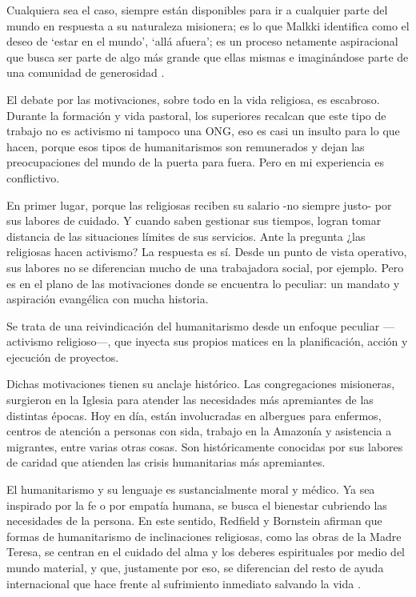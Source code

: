 \documentclass[
  spanish,
  11pt,
  a4paper,
]{scrbook}
\begin{document}
Cualquiera sea el caso, siempre están disponibles para ir a cualquier
parte del mundo en respuesta a su naturaleza misionera; es lo que Malkki
identifica como el deseo de `estar en el mundo', `allá afuera'; es un
proceso netamente aspiracional que busca ser parte de algo más grande
que ellas mismas e imaginándose parte de una comunidad de generosidad
\autocite[14]{Malkki2015}.

El debate por las motivaciones, sobre todo en la vida religiosa, es
escabroso. Durante la formación y vida pastoral, los superiores recalcan
que este tipo de trabajo no es activismo ni tampoco una ONG, eso es casi
un insulto para lo que hacen, porque esos tipos de humanitarismos son
remunerados y dejan las preocupaciones del mundo de la puerta para
fuera. Pero en mi experiencia es conflictivo.

En primer lugar, porque las religiosas reciben su salario -no siempre
justo- por sus labores de cuidado. Y cuando saben gestionar sus tiempos,
logran tomar distancia de las situaciones límites de sus servicios. Ante
la pregunta ¿las religiosas hacen activismo? La respuesta es sí. Desde
un punto de vista operativo, sus labores no se diferencian mucho de una
trabajadora social, por ejemplo. Pero es en el plano de las motivaciones
donde se encuentra lo peculiar: un mandato y aspiración evangélica con
mucha historia.

Se trata de una reivindicación del humanitarismo desde un enfoque
peculiar ---activismo religioso---, que inyecta sus propios matices en
la planificación, acción y ejecución de proyectos.

Dichas motivaciones tienen su anclaje histórico. Las congregaciones
misioneras, surgieron en la Iglesia para atender las necesidades más
apremiantes de las distintas épocas. Hoy en día, están involucradas en
albergues para enfermos, centros de atención a personas con sida,
trabajo en la Amazonía y asistencia a migrantes, entre varias otras
cosas. Son históricamente conocidas por sus labores de caridad que
atienden las crisis humanitarias más apremiantes.

El humanitarismo y su lenguaje es sustancialmente moral y médico. Ya sea
inspirado por la fe o por empatía humana, se busca el bienestar
cubriendo las necesidades de la persona. En este sentido, Redfield y
Bornstein afirman que formas de humanitarismo de inclinaciones
religiosas, como las obras de la Madre Teresa, se centran en el cuidado
del alma y los deberes espirituales por medio del mundo material, y que,
justamente por eso, se diferencian del resto de ayuda internacional que
hace frente al sufrimiento inmediato salvando la vida
\autocite[6]{Redfield2011}.
\end{document}

